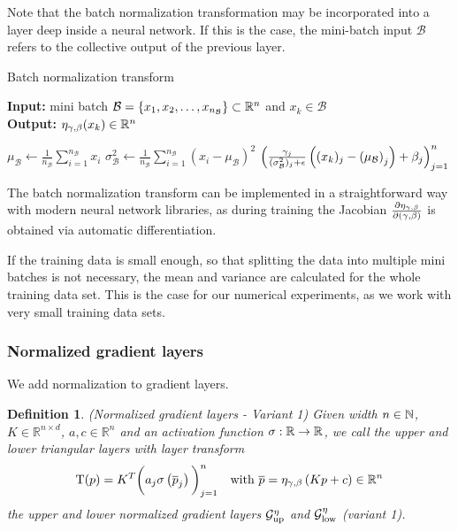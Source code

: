 \documentclass[twoside,a4paper]{article}
\newtheorem{definition}{Definition}
\begin{document}
Note that the batch normalization transformation may be incorporated into a layer
deep inside a neural network. If this is the case, the mini-batch input $\mathcal{B}$ 
refers to the collective output of the previous layer.

\begin{algorithm}\label{algo_batch_norm}
	\caption{Batch normalization transform}
	\textbf{Input:} mini batch $\mathcal{B} = \{x_1, x_2, \dots, x_{n_\mathcal{B}}\} \subset \mathbb{R}^n$ 
	and $x_k \in \mathcal{B}$ \\
	\textbf{Output:} $\eta_{\gamma, \beta}(x_k) \in \mathbb{R}^n$
	\begin{algorithmic}
		 
			\State $\mu_\mathcal{B} \gets \frac{1}{n_\mathcal{B}} \sum_{i=1}^{n_\mathcal{B}} x_i$
			\State $\sigma^2_\mathcal{B} \gets \frac{1}{n_\mathcal{B}} \sum_{i=1}^{n_\mathcal{B}} 
			(x_i - \mu_\mathcal{B})^2$
		\EndIf
		\State \Return 
		$\left( \frac{\gamma_j}{(\sigma^2_\mathcal{B})_j + \epsilon} 
		\left( (x_k)_j - \left( \mu_\mathcal{B} \right)_j \right) + \beta_j \right)_{j=1}^n$
	\end{algorithmic}
\end{algorithm}

The batch normalization transform can be implemented in a straightforward way with modern
neural network libraries, as during training the Jacobian $\frac{\partial \eta_{\gamma, \beta}}{\partial (\gamma, \beta)}$ 
is obtained via automatic differentiation.

If the training data is small enough, so that splitting the data into multiple mini batches
is not necessary, the mean and variance are calculated for the whole training data set. This is the
case for our numerical experiments, as we work with very small training data sets.

\subsubsection{Normalized gradient layers}

We add normalization to gradient layers.

\begin{definition}\label{def_norm_gradient_layers_1}
	(Normalized gradient layers - Variant 1)
	Given width $n \in \mathbb{N}$, $K \in \mathbb{R}^{n \times d}$, $a,c \in \mathbb{R}^n$ and
	an activation function $\sigma : \mathbb{R} \to \mathbb{R}$,
	we call the upper and lower triangular layers with layer transform
	\begin{equation*}
		\mathrm{T}(p) = K^T \bigg( a_j \sigma
		\left( \overline{p}_j \right) \bigg)_{j=1}^n
		\quad \text{with } \overline{p} = \eta_{\gamma, \beta} \left( Kp + c \right) \in \mathbb{R}^n
	\end{equation*}
	the upper and lower normalized gradient layers 
	$\mathcal{G}_{\text{up}}^{\eta}$ and $\mathcal{G}_{\text{low}}^{\eta}$ (variant 1).
\end{definition}
\end{document}
